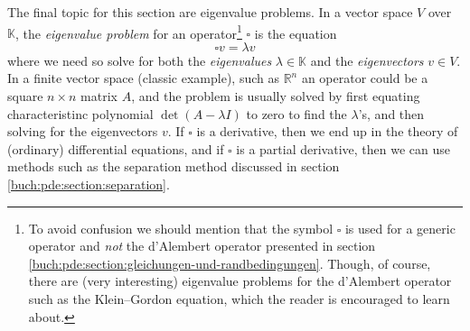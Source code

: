 The final topic for this section are eigenvalue problems. In a vector space
$V$ over $\mathbb{K}$, the \emph{eigenvalue problem} for an
operator\footnote{To avoid confusion we should mention that the symbol
$\square$ is used for a generic operator and \emph{not} the d'Alembert
operator presented in section
\ref{buch:pde:section:gleichungen-und-randbedingungen}. Though, of course,
there are (very interesting) eigenvalue problems for the d'Alembert operator
such as the Klein–Gordon equation, which the reader is encouraged to learn
about.} $\square$ is the equation
\begin{equation*}
  \square v = \lambda v
\end{equation*}
where we need so solve for both the \emph{eigenvalues} $\lambda \in
\mathbb{K}$ and the \emph{eigenvectors} $v \in V$. In a finite vector space
(classic example), such as $\mathbb{R}^n$ an operator could be a square
$n\times n$ matrix $A$, and the problem is usually solved by first equating
characteristinc polynomial $\det(A - \lambda I)$ to zero to find the
$\lambda$'s, and then solving for the eigenvectors $v$. If $\square$ is a
derivative, then we end up in the theory of (ordinary) differential equations,
and if $\square$ is a partial derivative, then we can use methods such as the
separation method discussed in section \ref{buch:pde:section:separation}.

